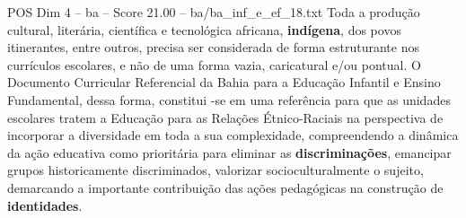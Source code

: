 \begin{textsample}{POS Dim 4 – ba – Score 21.00 – ba/ba\_inf\_e\_ef\_18.txt}
Toda a produção cultural, literária, científica e tecnológica africana, \textbf{indígena}, dos povos itinerantes, entre outros, precisa ser considerada de forma estruturante nos currículos escolares, e não de uma forma vazia, caricatural e/ou pontual.
O Documento Curricular Referencial da Bahia para a Educação Infantil e Ensino Fundamental, dessa forma, constitui -se em uma referência para que as unidades escolares tratem a Educação para as Relações Étnico-Raciais na perspectiva de incorporar a diversidade em toda a sua complexidade, compreendendo a dinâmica da ação educativa como prioritária para eliminar as \textbf{discriminações}, emancipar grupos historicamente discriminados, valorizar socioculturalmente o sujeito, demarcando a importante contribuição das ações pedagógicas na construção de \textbf{identidades}.

\end{textsample}
